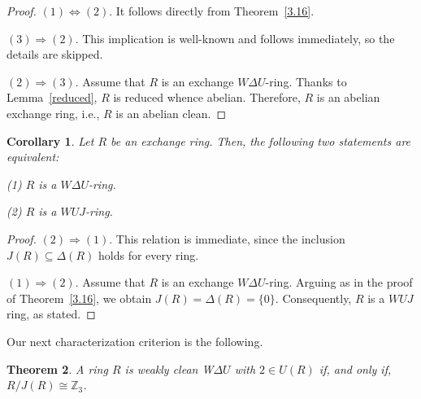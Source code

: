 \documentclass[12pt]{amsart}
\newtheorem{theorem}{Theorem}[section]
\newtheorem{corollary}[theorem]{Corollary}
\theoremstyle{definition}
\begin{document}
\begin{proof}
$(1) \Leftrightarrow (2)$. It follows directly from Theorem~\ref{3.16}.
	
$(3) \Rightarrow(2) $. This implication is well-known and follows immediately, so the details are skipped.
	
$(2) \Rightarrow (3)$. Assume that $R$ is an exchange $W\Delta U$-ring. Thanks to Lemma~\ref{reduced}, $R$ is reduced whence abelian. Therefore, $R$ is an abelian exchange ring, i.e., $R$ is an abelian clean. 
\end{proof}

\begin{corollary}\label{3.19}
Let $R$ be an exchange ring. Then, the following two statements are equivalent:

(1) $R$ is a $W\Delta U$-ring.

(2) $R$ is a $WUJ$-ring.
\end{corollary}

\begin{proof}
$(2) \Rightarrow (1)$. This relation is immediate, since the inclusion $J(R)\subseteq \Delta(R)$ holds for every ring.
	
$(1) \Rightarrow (2)$. Assume that $R$ is an exchange $W\Delta U$-ring. Arguing as in the proof of Theorem~\ref{3.16}, we obtain
$
J(R)=\Delta(R)=\{0\}.
$
Consequently, $R$ is a $WUJ$ ring, as stated.
\end{proof}

Our next characterization criterion is the following.

\begin{theorem}\label{fin2}
A ring \( R \) is weakly clean W\(\Delta U\) with \( 2 \in U(R) \) if, and only if, \( R / J(R) \cong \mathbb{Z}_3 \).
\end{theorem}
\end{document}
